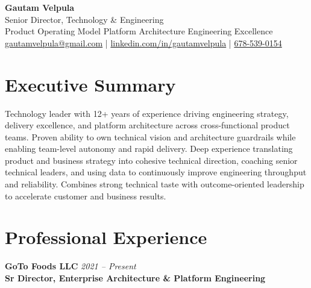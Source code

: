 \documentclass[11pt]{article}
\begin{document}
\begin{center}
    {\LARGE \textbf{Gautam Velpula}} \\[4pt]
    Senior Director, Technology \& Engineering \\[6pt]
    Product Operating Model \textbullet{} Platform Architecture \textbullet{} Engineering Excellence \\[6pt]
    \href{mailto:gautamvelpula@gmail.com}{gautamvelpula@gmail.com} \;|\;
    \href{https://www.linkedin.com/in/gautamvelpula}{linkedin.com/in/gautamvelpula} \;|\;
    \href{tel:6785390154}{678-539-0154}
  \end{center}

\vspace{8pt}

\section*{Executive Summary}
Technology leader with 12+ years of experience driving engineering strategy, delivery excellence, and platform architecture across cross-functional product teams. Proven ability to own technical vision and architecture guardrails while enabling team-level autonomy and rapid delivery. Deep experience translating product and business strategy into cohesive technical direction, coaching senior technical leaders, and using data to continuously improve engineering throughput and reliability. Combines strong technical taste with outcome-oriented leadership to accelerate customer and business results.

\section*{Professional Experience}

\textbf{GoTo Foods LLC} \hfill \textit{2021 -- Present} \\
\textbf{Sr Director, Enterprise Architecture \& Platform Engineering}
\end{document}
